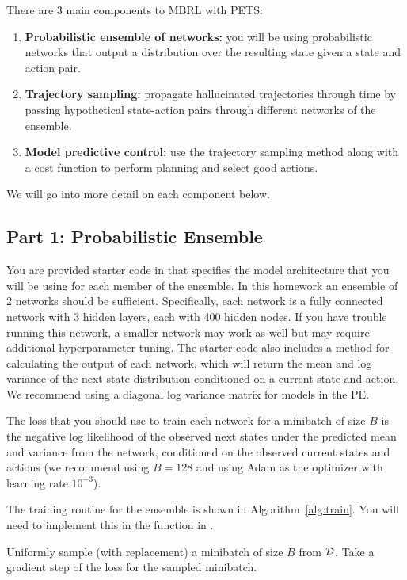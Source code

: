 \documentclass[11pt]{article}
\begin{document}
There are 3 main components to MBRL with PETS:
\begin{enumerate}
  \item \textbf{Probabilistic ensemble of networks:} you will be using probabilistic networks that output a distribution over the resulting state given a state and action pair.
  \item \textbf{Trajectory sampling:} propagate hallucinated trajectories through time by passing hypothetical state-action pairs through different networks of the ensemble.
  \item \textbf{Model predictive control:} use the trajectory sampling method along with a cost function to perform planning and select good actions.
\end{enumerate}
We will go into more detail on each component below.

\subsection*{Part 1: Probabilistic Ensemble}
You are provided starter code in  that specifies the model architecture that you will be using for each member of the ensemble. In this homework an ensemble of 2 networks should be sufficient. Specifically, each network is a fully connected network with 3 hidden layers, each with 400 hidden nodes. If you have trouble running this network, a smaller network may work as well but may require additional hyperparameter tuning. The starter code also includes a method for calculating the output of each network, which will return the mean and log variance of the next state distribution conditioned on a current state and action. We recommend using a diagonal log variance matrix for models in the PE.

The loss that you should use to train each network for a minibatch of size $B$ is the negative log likelihood of the observed next states under the predicted mean and variance from the network, conditioned on the observed current states and actions (we recommend using $B = 128$ and using Adam as the optimizer with learning rate $10^{-3}$).

The training routine for the ensemble is shown in Algorithm~\ref{alg:train}. You will need to implement this in the  function in .

\begin{algorithm}[H]
\caption{Training the Probabilistic Ensemble}\label{alg:train}
\begin{algorithmic}[1]
    \State Uniformly sample (with replacement) a minibatch of size $B$ from $\mathcal{D}$.
    \State Take a gradient step of the loss for the sampled minibatch.
  \EndFor
\EndProcedure
\end{algorithmic}
\end{algorithm}
\end{document}
